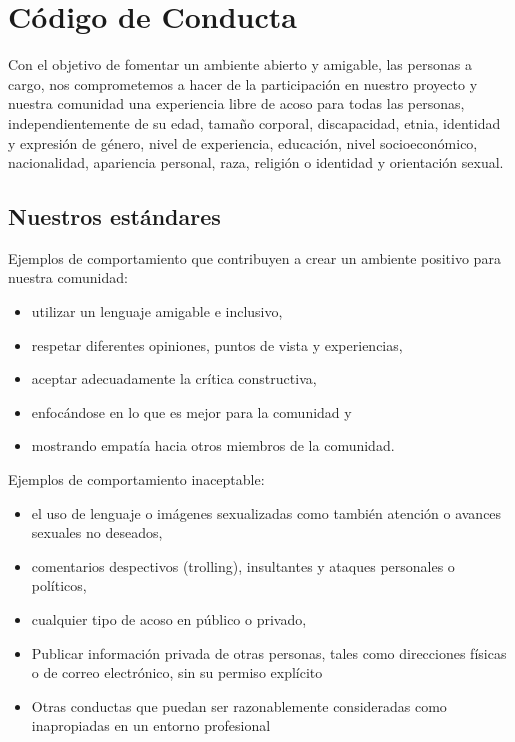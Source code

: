\chapter{C\'odigo de Conducta}\label{s:conduct}

Con el objetivo de fomentar un ambiente abierto y amigable, las personas 
a cargo, nos comprometemos a hacer de la participaci\'on en nuestro proyecto 
y nuestra comunidad una experiencia libre de acoso para todas las personas, 
independientemente de su edad, tama\~no corporal, discapacidad, etnia, 
identidad y expresi\'on de g\'enero, nivel de experiencia, educaci\'on, 
nivel socioecon\'omico, nacionalidad, apariencia personal, raza, 
religi\'on o identidad y orientaci\'on sexual.

\section*{Nuestros est\'andares}

Ejemplos de comportamiento que contribuyen a crear un ambiente positivo 
para nuestra comunidad:

\begin{itemize}
\item
  utilizar un lenguaje amigable e inclusivo, 
\item
  respetar diferentes opiniones, puntos de vista y experiencias,
\item
  aceptar adecuadamente la cr\'itica constructiva,
\item
  enfoc\'andose en lo que es mejor para la comunidad y
\item
  mostrando empat\'ia hacia otros miembros de la comunidad.
\end{itemize}

\noindent
Ejemplos de comportamiento inaceptable:

\begin{itemize}
\item
  el uso de lenguaje o im\'agenes sexualizadas como tambi\'en 
  atenci\'on o avances sexuales no deseados,
\item
  comentarios despectivos (trolling), insultantes y ataques personales o pol\'iticos,
\item
  cualquier tipo de acoso en p\'ublico o privado,
\item
  Publicar informaci\'on privada de otras personas, tales como direcciones 
  f\'isicas o de correo electr\'onico, sin su permiso expl\'icito
\item
  Otras conductas que puedan ser razonablemente consideradas 
  como inapropiadas en un entorno profesional
\end{itemize}

